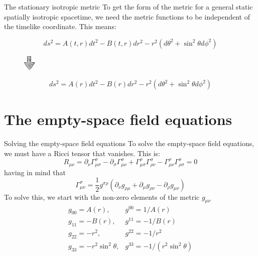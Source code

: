 \documentclass[xcolor=dvipsnames]{beamer}
\begin{document}
\begin{frame}{The stationary isotropic metric}
    To get the form of the metric for a general static spatially isotropic spacetime, we need the metric functions to be independent of the timelike coordinate. This means:
    \begin{block}
    {}$$
d s^{2}=A(t, r) d t^{2}-B(t, r) d r^{2}-r^{2}\left(d \theta^{2}+\sin ^{2} \theta d \phi^{2}\right)
$$
    \end{block}
    \begin{figure}
        \centering
        \includegraphics[width=0.05\textwidth]{Presentations/Images/1_da.png}
    \end{figure}
    \begin{block}
    {}$$
d s^{2}=A( r) d t^{2}-B(r) d r^{2}-r^{2}\left(d \theta^{2}+\sin ^{2} \theta d \phi^{2}\right)
$$
    \end{block}
\end{frame}
\section{The empty-space field equations}
\begin{frame}{Solving the empty-space field equations}
To solve the empty-space field equations, we must have a Ricci tensor that vanishes. This is:
    $$
R_{\mu \nu}=\partial_{\nu} \Gamma_{\mu \sigma}^{\sigma}-\partial_{\sigma} \Gamma_{\mu \nu}^{\sigma}+\Gamma_{\mu \sigma}^{\rho} \Gamma_{\rho \nu}^{\sigma}-\Gamma_{\mu \nu}^{\rho} \Gamma_{\rho \sigma}^{\sigma}=0
$$
having in mind that
$$
\Gamma_{\mu \nu}^{\sigma}=\frac{1}{2} g^{\sigma \rho}\left(\partial_{\nu} g_{\rho \mu}+\partial_{\mu} g_{\rho \nu}-\partial_{\rho} g_{\mu \nu}\right)
$$
To solve this, we start with the non-zero elements of the metric $g_{\mu\nu}$
  $$
\begin{array}{ll}
g_{00}=A(r), & g^{00}=1 / A(r) \\
g_{11}=-B(r), & g^{11}=-1 / B(r) \\
g_{22}=-r^{2}, & g^{22}=-1 / r^{2} \\
g_{33}=-r^{2} \sin ^{2} \theta, & g^{33}=-1 /\left(r^{2} \sin ^{2} \theta\right)
\end{array}
$$
\end{frame}
\end{document}
